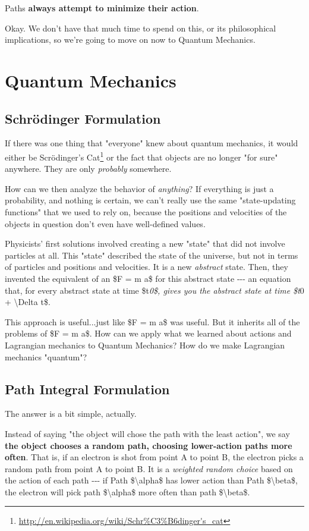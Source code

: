 \documentclass[]{article}
\renewcommand{\href}[2]{#2\footnote{\url{#1}}}
\begin{document}
Paths \textbf{always attempt to minimize their action}.

Okay. We don't have that much time to spend on this, or its philosophical
implications, so we're going to move on now to Quantum Mechanics.

\section{Quantum Mechanics}

\subsection{Schrödinger Formulation}

If there was one thing that "everyone" knew about quantum mechanics, it would
either be
\href{http://en.wikipedia.org/wiki/Schr\%C3\%B6dinger's_cat}{Scrödinger's Cat}
or the fact that objects are no longer "for sure" anywhere. They are only
\emph{probably} somewhere.

How can we then analyze the behavior of \emph{anything}? If everything is just a
probability, and nothing is certain, we can't really use the same
"state-updating functions" that we used to rely on, because the positions and
velocities of the objects in question don't even have well-defined values.

Physicists' first solutions involved creating a new "state" that did not involve
particles at all. This "state" described the state of the universe, but not in
terms of particles and positions and velocities. It is a new \emph{abstract}
state. Then, they invented the equivalent of an \$F = m a\$ for this abstract
state -\/-\/- an equation that, for every abstract state at time \$t\emph{0\$,
gives you the abstract state at time \$t}0 + \textbackslash{}Delta t\$.

This approach is useful...just like \$F = m a\$ was useful. But it inherits all
of the problems of \$F = m a\$. How can we apply what we learned about actions
and Lagrangian mechanics to Quantum Mechanics? How do we make Lagrangian
mechanics "quantum"?

\subsection{Path Integral Formulation}

The answer is a bit simple, actually.

Instead of saying "the object will chose the path with the least action", we say
\textbf{the object chooses a random path, choosing lower-action paths more
often}. That is, if an electron is shot from point A to point B, the electron
picks a random path from point A to point B. It is a \emph{weighted random
choice} based on the action of each path -\/-\/- if Path
\$\textbackslash{}alpha\$ has lower action than Path \$\textbackslash{}beta\$,
the electron will pick path \$\textbackslash{}alpha\$ more often than path
\$\textbackslash{}beta\$.
\end{document}
